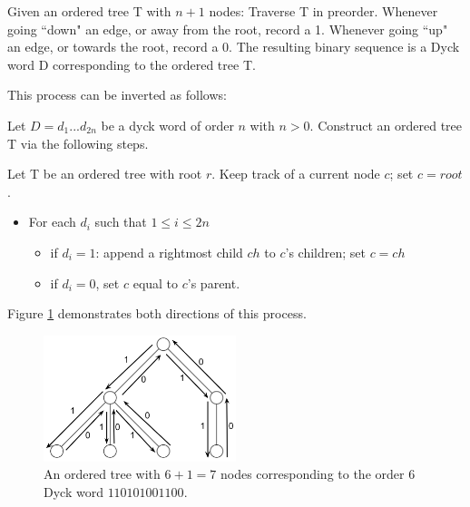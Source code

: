 Given an ordered tree T with $n+1$ nodes: Traverse T in preorder.  Whenever going ``down" an edge, or away from the root, record a 1.  Whenever going ``up" an edge, or towards the root, record a 0.  The resulting binary sequence is a Dyck word D corresponding to the ordered tree T. 

This process can be inverted as follows: 

Let $D=d_1...d_{2n}$ be a dyck word of order $n$ with $n > 0$. Construct an ordered tree T via the following steps. 

Let T be an ordered tree with root $r$.  Keep track of a current node $c$; set $c=root$.

\begin{itemize}
    \item For each $d_i$ such that $1 \le i \le 2n$ 
	\begin{itemize}
	    \item if $d_i=1$: append a rightmost child $ch$ to $c$'s children; set $c=ch$
	    \item if $d_i=0$, set $c$ equal to $c$'s parent.
	\end{itemize}

\end{itemize}
Figure \ref{ordered_tree_bijection_illustration} demonstrates both directions of this process. %

\begin{figure}[H]
    \centering
    \includegraphics[width=0.5\textwidth]{otreebij.png}
    \caption{An ordered tree with $6+1=7$ nodes corresponding to the order 6 Dyck word $110101001100$.}
    \label{ordered_tree_bijection_illustration}
\end{figure}



